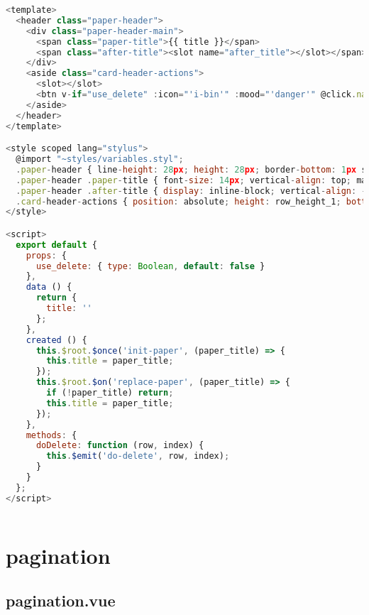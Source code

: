 \begin{lstlisting}[language=JavaScript]
<template>
  <header class="paper-header">
    <div class="paper-header-main">
      <span class="paper-title">{{ title }}</span>
      <span class="after-title"><slot name="after_title"></slot></span>
    </div>
    <aside class="card-header-actions">
      <slot></slot>
      <btn v-if="use_delete" :icon="'i-bin'" :mood="'danger'" @click.native="doDelete()"></btn>
    </aside>
  </header>
</template>

<style scoped lang="stylus">
  @import "~styles/variables.styl";
  .paper-header { line-height: 28px; height: 28px; border-bottom: 1px solid light_gray_1; }
  .paper-header .paper-title { font-size: 14px; vertical-align: top; margin-right: 2px; }
  .paper-header .after-title { display: inline-block; vertical-align: -3px; height: row_height_1; }
  .card-header-actions { position: absolute; height: row_height_1; bottom: 3px; right: 0; }
</style>

<script>
  export default {
    props: {
      use_delete: { type: Boolean, default: false }
    },
    data () {
      return {
        title: ''
      };
    },
    created () {
      this.$root.$once('init-paper', (paper_title) => {
        this.title = paper_title;
      });
      this.$root.$on('replace-paper', (paper_title) => {
        if (!paper_title) return;
        this.title = paper_title;
      });
    },
    methods: {
      doDelete: function (row, index) {
        this.$emit('do-delete', row, index);
      }
    }
  };
</script>

\end{lstlisting}



\begin{lstlisting}[language=JavaScript]

\end{lstlisting}

\chapter{pagination}


\section{pagination.vue}


